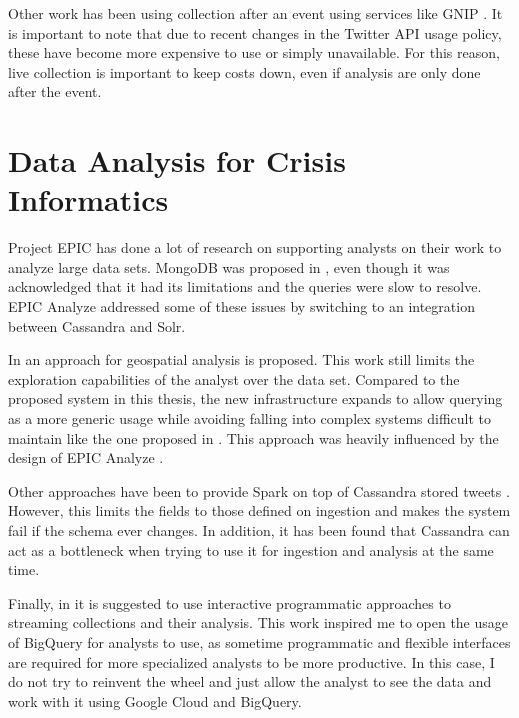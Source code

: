 Other work has been using collection after an event using services like GNIP \cite{ashktorab2014tweedr}. It is important to note that due to recent changes in the Twitter API usage policy, these have become more expensive to use or simply unavailable. For this reason, live collection is important to keep costs down, even if analysis are only done after the event.

\section{Data Analysis for Crisis Informatics}

Project EPIC has done a lot of research on supporting analysts on their work to analyze large data sets. MongoDB was proposed in \cite{anderson2013architectural}, even though it was acknowledged that it had its limitations and the queries were slow to resolve. EPIC Analyze \cite{anderson2015design,barrenechea2015getting} addressed some of these issues by switching to an integration between Cassandra and Solr. 

In \cite{oussalah2013software} an approach for geospatial analysis is proposed. This work still limits the exploration capabilities of the analyst over the data set. Compared to the proposed system in this thesis, the new infrastructure expands to allow querying as a more generic usage while avoiding falling into complex systems difficult to maintain like the one proposed in \cite{oussalah2013software}. This approach was heavily influenced by the design of EPIC Analyze \cite{barrenechea2015getting}.

Other approaches have been to provide Spark on top of Cassandra stored tweets \cite{casas2017big}. However, this limits the fields to those defined on ingestion and makes the system fail if the schema ever changes. In addition, it has been found that Cassandra can act as a bottleneck when trying to use it for ingestion and analysis at the same time.

Finally, in \cite{madhavilatha2016streaming} it is suggested to use interactive programmatic approaches to streaming collections and their analysis. This work inspired me to open the usage of BigQuery for analysts to use, as sometime programmatic and flexible interfaces are required for more specialized analysts to be more productive. In this case, I do not try to reinvent the wheel and just allow the analyst to see the data and work with it using Google Cloud and BigQuery. 


